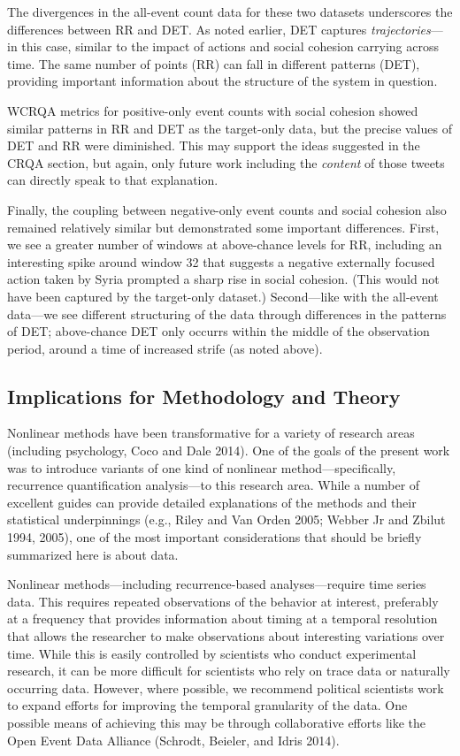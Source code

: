 \documentclass[english,man]{apa6}
\begin{document}
The divergences in the all-event count data for these two datasets underscores
the differences between RR and DET. As noted earlier, DET captures
\emph{trajectories}---in this case, similar to the impact of actions and social
cohesion carrying across time. The same number of points (RR) can fall in
different patterns (DET), providing important information about the structure of
the system in question.

WCRQA metrics for positive-only event counts with social cohesion showed similar
patterns in RR and DET as the target-only data, but the precise values of DET
and RR were diminished. This may support the ideas suggested in the CRQA
section, but again, only future work including the \emph{content} of those tweets can
directly speak to that explanation.

Finally, the coupling between negative-only event counts and social cohesion
also remained relatively similar but demonstrated some important differences.
First, we see a greater number of windows at above-chance levels for RR,
including an interesting spike around window 32 that suggests a negative
externally focused action taken by Syria prompted a sharp rise in social
cohesion. (This would not have been captured by the target-only dataset.)
Second---like with the all-event data---we see different structuring of the data
through differences in the patterns of DET; above-chance DET only occurrs within
the middle of the observation period, around a time of increased strife (as
noted above).

\hypertarget{implications-for-methodology-and-theory}{%
\subsection{Implications for Methodology and Theory}\label{implications-for-methodology-and-theory}}

Nonlinear methods have been transformative for a variety of research areas
(including psychology, Coco and Dale 2014). One of the goals of the present work was
to introduce variants of one kind of nonlinear method---specifically, recurrence
quantification analysis---to this research area. While a number of excellent
guides can provide detailed explanations of the methods and their statistical
underpinnings (e.g., Riley and Van Orden 2005; Webber Jr and Zbilut 1994, 2005), one of the most important considerations that should be
briefly summarized here is about data.

Nonlinear methods---including recurrence-based analyses---require time series
data. This requires repeated observations of the behavior at interest,
preferably at a frequency that provides information about timing at a temporal
resolution that allows the researcher to make observations about interesting
variations over time. While this is easily controlled by scientists who conduct
experimental research, it can be more difficult for scientists who rely on trace
data or naturally occurring data. However, where possible, we recommend
political scientists work to expand efforts for improving the temporal
granularity of the data. One possible means of achieving this may be through
collaborative efforts like the Open Event Data Alliance (Schrodt, Beieler, and Idris 2014).
\end{document}
